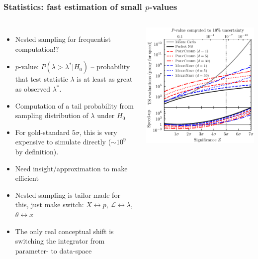 \documentclass[aspectratio=169]{beamer}
\begin{document}
\begin{frame}
    \frametitle{Statistics: fast estimation of small $p$-values~}
    \begin{columns}
        \begin{itemize}
            \item Nested sampling for frequentist computation!?
            \item $p$-value: $P(\lambda>\lambda^*|H_0)$ -- probability that test statistic $\lambda$ is at least as great as observed $\lambda^*$.
            \item Computation of a tail probability from sampling distribution of $\lambda$ under $H_0$
            \item For gold-standard $5\sigma$, this is very expensive to simulate directly ($\sim10^9$ by definition).
            \item Need insight/approximation to make efficient
            \item Nested sampling is tailor-made for this, just make switch: $X\leftrightarrow p$, $\mathcal{L}\leftrightarrow\lambda$, $\theta \leftrightarrow x$
            \item The only real conceptual shift is switching the integrator from parameter- to data-space
        \end{itemize}
        \includegraphics[width=\textwidth]{figures/pvalue.pdf}
    \end{columns}
    
\end{frame}
\end{document}
